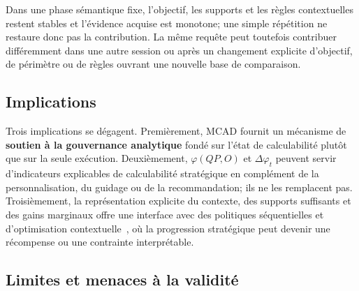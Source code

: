 \documentclass[journal]{IEEEtran}
\begin{document}
Dans une phase sémantique fixe, l'objectif, les supports et les règles contextuelles restent stables et l'évidence acquise est monotone; une simple répétition ne restaure donc pas la contribution. La même requête peut toutefois contribuer différemment dans une autre session ou après un changement explicite d'objectif, de périmètre ou de règles ouvrant une nouvelle base de comparaison.

\subsection{Implications}

Trois implications se dégagent. Premièrement, MCAD fournit un mécanisme de \textbf{soutien à la gouvernance analytique} fondé sur l'état de calculabilité plutôt que sur la seule exécution. Deuxièmement, $\varphi(QP,O)$ et $\Delta\varphi_t$ peuvent servir d'indicateurs explicables de calculabilité stratégique en complément de la personnalisation, du guidage ou de la recommandation; ils ne les remplacent pas. Troisièmement, la représentation explicite du contexte, des supports suffisants et des gains marginaux offre une interface avec des politiques séquentielles et d'optimisation contextuelle~\cite{SadanaEJOR2025}, où la progression stratégique peut devenir une récompense ou une contrainte interprétable.

\subsection{Limites et menaces à la validité}
\end{document}
